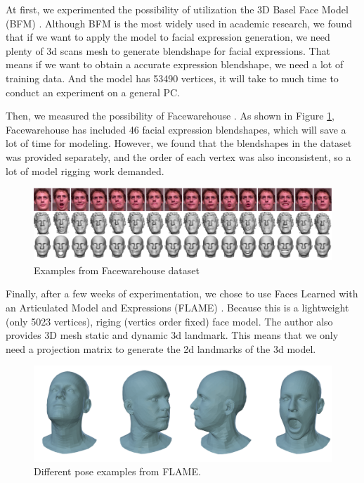 At first, we experimented the possibility of utilization the 3D Basel Face Model (BFM) \citep{bfm09}. Although BFM is the most widely used in academic research, we found that if we want to apply the model to facial expression generation, we need plenty of 3d scans mesh to generate blendshape for facial expressions. That means if we want to obtain a accurate expression blendshape, we need a lot of training data. And the model has 53490 vertices, it will take to much time to conduct an experiment on a general PC. 

Then, we measured the possibility of Facewarehouse \citep*{10.1109/TVCG.2013.249}. As shown in Figure \ref{fig:facewarehouse}, Facewarehouse has included 46 facial expression blendshapes, which will save a lot of time for modeling. However, we found that the blendshapes in the dataset was provided separately, and the order of each vertex was also inconsistent, so a lot of model rigging work demanded.

\begin{figure}[H]
    \centering
    \includegraphics[width=\textwidth]{./figs/facewarehouse.png}
    \caption{Examples from Facewarehouse dataset }
    \label{fig:facewarehouse}
\end{figure}

Finally, after a few weeks of experimentation, we chose to use Faces Learned with an Articulated Model and Expressions (FLAME) \citep{flame}. Because this is a lightweight (only 5023 vertices), riging (vertics order fixed) face model. The author also provides 3D mesh static and dynamic 3d landmark. This means that we only need a projection matrix to generate the 2d landmarks of the 3d model.

\begin{figure}[H]
    \centering
    \includegraphics[width=\textwidth]{./figs/flame.png}
    \caption{Different pose examples from FLAME.}
    \label{fig:flame}
\end{figure}

